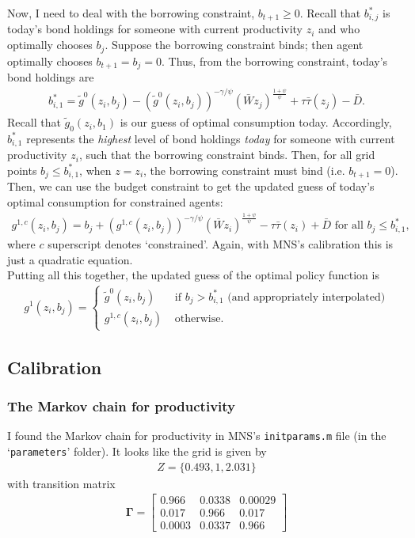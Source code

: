 \documentclass[12pt]{article}
\begin{document}
Now, I need to deal with the borrowing constraint, $b_{t+1} \geq 0$. Recall that $b^*_{i,j}$ is today's bond holdings for someone with current productivity $z_i$ and who optimally chooses $b_j$. Suppose the borrowing constraint binds;  then agent optimally chooses $b_{t+1} = b_j =0$. Thus, from the borrowing constraint, today's bond holdings are
\begin{align*}
b^*_{i,1} = \tilde g^0(z_i,b_j) - \left(\tilde g^0(z_i,b_j)\right)^{-\gamma/\psi} (\bar Wz_j)^{\frac{1+\psi}{\psi}} + \tau\bar\tau(z_j) - \bar D.
\end{align*}
Recall that $\tilde g_0(z_i,b_1)$ is our guess of optimal consumption today. Accordingly, $b^*_{i,1}$ represents the \textit{highest} level of bond holdings \textit{today} for someone with current productivity $z_i$, such that the borrowing constraint binds. Then, for all grid points $b_j \leq b^*_{i,1}$, when $z=z_i$, the borrowing constraint must bind (i.e. $b_{t+1}=0$). Then, we can use the budget constraint to get the updated guess of today's optimal consumption for constrained agents:
\begin{align*}
g^{1,c}(z_i,b_j) = b_j + \left(g^{1,c}(z_i,b_j)\right)^{-\gamma/\psi} (\bar Wz_i)^{\frac{1+\psi}{\psi}} - \tau\bar\tau(z_i) +\bar D \text{ for all } b_j \leq b^*_{i,1},
\end{align*}
where $c$ superscript denotes `constrained'. Again, with MNS's calibration this is just a quadratic equation.\\

Putting all this together, the updated guess of the optimal policy function is
\begin{align*}
g^1(z_i,b_j) = 
\begin{cases}
\tilde g^0(z_i,b_j) &\text{ if } b_j > b^*_{i,1} \text{ (and appropriately interpolated)}\\
g^{1,c}(z_i,b_j)&\text{ otherwise.}
\end{cases}
\end{align*}

\subsection{Calibration}
\subsubsection{The Markov chain for productivity}
I found the Markov chain for productivity in MNS's \verb|initparams.m| file (in the `\verb|parameters|' folder). It looks like the grid is given by
\begin{align*}
Z = \{0.493, 1, 2.031\}
\end{align*}
with transition matrix
\begin{align*}
\bm{\Gamma} = 
\begin{bmatrix}
0.966 &	0.0338 &	0.00029 \\
0.017&	0.966& 	0.017 \\
0.0003 &	0.0337 &	0.966
\end{bmatrix}
\end{align*}
\end{document}
